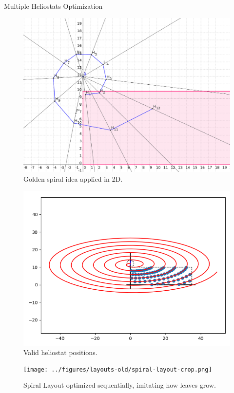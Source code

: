 \documentclass[10pt, xcolor={dvipsnames}]{beamer}
\begin{document}
\begin{frame}{Multiple Heliostats Optimization}
\begin{minipage}[t]{0.5\textwidth}
\begin{center}
\begin{figure}
\includegraphics[width=\textwidth]{../figures/spiral/spiral-construction.png}
\caption{Golden spiral idea applied in 2D.}
\end{figure}
\end{center}
\end{minipage}%
\begin{minipage}[t]{0.5\textwidth}
\begin{center}
\vspace{-.5cm}
\begin{figure}
\includegraphics[width=\textwidth]{../figures/spiral/spiral_plot.png}
\caption{Valid heliostat positions.}
\end{figure}
\end{center}
\end{minipage}
\begin{center}
\begin{figure}
\texttt{[image: ../figures/layouts-old/spiral-layout-crop.png]}
\caption{Spiral Layout optimized sequentially, imitating how leaves grow.}
\end{figure}
\end{center}
\end{frame}
\end{document}
